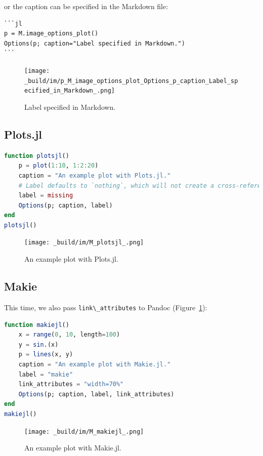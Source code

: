 \documentclass[
  notoc %
]{tufte-book}
\newcommand{\passthrough}[1]{#1}
\begin{document}
or the caption can be specified in the Markdown file:

\begin{lstlisting}
```jl
p = M.image_options_plot()
Options(p; caption="Label specified in Markdown.")
```
\end{lstlisting}

\begin{figure}
\centering
\texttt{[image: \_build/im/p\_M\_image\_options\_plot\_Options\_p\_caption\_Label\_specified\_in\_Markdown\_.png]}
\caption{Label specified in Markdown.}
\end{figure}

\hfill\break

\hypertarget{sec:jlplots}{%
\subsection{Plots.jl}\label{sec:jlplots}}

\begin{lstlisting}[language=Julia]
function plotsjl()
    p = plot(1:10, 1:2:20)
    caption = "An example plot with Plots.jl."
    # Label defaults to `nothing`, which will not create a cross-reference.
    label = missing
    Options(p; caption, label)
end
plotsjl()
\end{lstlisting}

\begin{figure}
\centering
\texttt{[image: \_build/im/M\_plotsjl\_.png]}
\caption{An example plot with Plots.jl.}
\end{figure}

\hypertarget{sec:makie}{%
\subsection{Makie}\label{sec:makie}}

This time, we also pass \passthrough{\lstinline!link\_attributes!} to
Pandoc (Figure~\ref{fig:makie}):

\begin{lstlisting}[language=Julia]
function makiejl()
    x = range(0, 10, length=100)
    y = sin.(x)
    p = lines(x, y)
    caption = "An example plot with Makie.jl."
    label = "makie"
    link_attributes = "width=70%"
    Options(p; caption, label, link_attributes)
end
makiejl()
\end{lstlisting}

\begin{figure}
\hypertarget{fig:makie}{%
\centering
\texttt{[image: \_build/im/M\_makiejl\_.png]}
\caption{An example plot with Makie.jl.}\label{fig:makie}
}
\end{figure}
\end{document}
